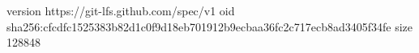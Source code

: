 version https://git-lfs.github.com/spec/v1
oid sha256:cfcdfc1525383b82d1c0f9d18eb701912b9ecbaa36fc2c717ecb8ad3405f34fe
size 128848
